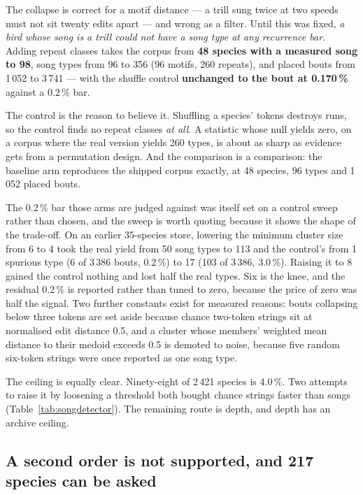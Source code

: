 \documentclass[10pt,twocolumn,a4paper]{article}
\begin{document}
The collapse is correct for a motif distance --- a trill sung twice at two speeds must not
sit twenty edits apart --- and wrong as a filter. Until this was fixed, \emph{a bird whose
song is a trill could not have a song type at any recurrence bar.} Adding repeat classes takes
the corpus from \textbf{48 species with a measured song to 98}, song types from 96 to 356
(96 motifs, 260 repeats), and placed bouts from 1\,052 to 3\,741 --- with the shuffle control
\textbf{unchanged to the bout at 0.170\,\%} against a 0.2\,\% bar.

The control is the reason to believe it. Shuffling a species' tokens destroys runs, so the
control finds no repeat classes \emph{at all}. A statistic whose null yields zero, on a
corpus where the real version yields 260 types, is about as sharp as evidence gets from a
permutation design. And the comparison is a comparison: the baseline arm reproduces the
shipped corpus exactly, at 48 species, 96 types and 1\,052 placed bouts.

The 0.2\,\% bar those arms are judged against was itself set on a control sweep rather than
chosen, and the sweep is worth quoting because it shows the shape of the trade-off. On an
earlier 35-species store, lowering the minimum cluster size from 6 to 4 took the real yield
from 50 song types to 113 and the control's from 1 spurious type (6 of 3\,386 bouts, 0.2\,\%)
to 17 (103 of 3\,386, 3.0\,\%). Raising it to 8 gained the control nothing and lost half the
real types. Six is the knee, and the residual 0.2\,\% is reported rather than tuned to zero,
because the price of zero was half the signal. Two further constants exist for measured
reasons: bouts collapsing below three tokens are set aside because chance two-token strings
sit at normalised edit distance 0.5, and a cluster whose members' weighted mean distance to
their medoid exceeds 0.5 is demoted to noise, because five random six-token strings were once
reported as one song type.

The ceiling is equally clear. Ninety-eight of 2\,421 species is 4.0\,\%. Two attempts to
raise it by loosening a threshold both bought chance strings faster than songs
(Table~\ref{tab:songdetector}). The remaining route is depth, and depth has an archive
ceiling.

\subsection{A second order is not supported, and 217 species can be asked}
\end{document}
